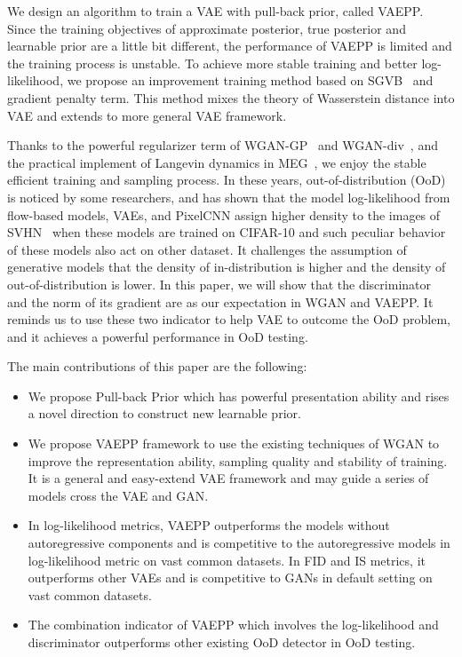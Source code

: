 We design an algorithm to train a VAE with pull-back prior, called VAEPP. Since the training objectives of approximate posterior, true posterior and learnable prior are a little bit different, the performance of VAEPP is limited and the training process is unstable. To achieve more stable training and better log-likelihood, we propose an improvement training method based on SGVB~\cite{kingma2014auto} and gradient penalty term. This method mixes the theory of Wasserstein distance into VAE and extends to more general VAE framework. 

Thanks to the powerful regularizer term of WGAN-GP~\cite{gulrajani2017improved} and WGAN-div~\cite{wu2018wasserstein}, and the practical implement of Langevin dynamics in MEG~\cite{kumar2019maximum}, we enjoy the stable efficient training and sampling process. In these years, out-of-distribution (OoD) is noticed by some researchers, and \cite{nalisnick2018deep} has shown that the model log-likelihood from flow-based models, VAEs, and PixelCNN assign higher density to the images of SVHN~\cite{netzer2011reading} when these models are trained on CIFAR-10 and such peculiar behavior of these models also act on other dataset. It challenges the assumption of generative models that the density of in-distribution is higher and the density of out-of-distribution is lower. In this paper, we will show that the discriminator and the norm of its gradient are as our expectation in WGAN and VAEPP. It reminds us to use these two indicator to help VAE to outcome the OoD problem, and it achieves a powerful performance in OoD testing.

The main contributions of this paper are the following:
\begin{itemize}
	\item We propose Pull-back Prior which has powerful presentation ability and rises a novel direction to construct new learnable prior. 
	\item We propose VAEPP framework to use the existing techniques of WGAN to improve the representation ability, sampling quality and stability of training. It is a general and easy-extend VAE framework and may guide a series of models cross the VAE and GAN. 
	\item In log-likelihood metrics, VAEPP outperforms the models without autoregressive components and is competitive to the autoregressive models in log-likelihood metric on vast common datasets. In FID and IS metrics, it outperforms other VAEs and is competitive to GANs in default setting on vast common datasets. 
	\item The combination indicator of VAEPP which involves the log-likelihood and discriminator outperforms other existing OoD detector in OoD testing.
\end{itemize}
